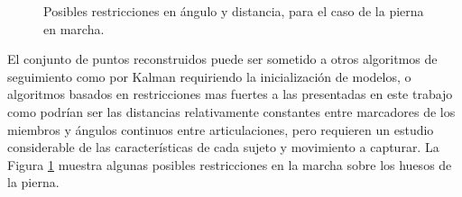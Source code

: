 \begin{figure}[ht!]
 \begin{center}
  \end{center}
\caption{Posibles restricciones en ángulo y distancia, para el caso de la pierna en marcha.}
\label{restricciones_tracking}
\end{figure}

El conjunto de puntos reconstruidos puede ser sometido a otros algoritmos de seguimiento como por Kalman \cite{kalman} requiriendo la inicialización de modelos, o algoritmos basados en restricciones mas fuertes a las presentadas en este trabajo como podrían ser las distancias relativamente constantes entre marcadores de los miembros y ángulos continuos entre articulaciones, pero requieren un estudio considerable de las características de cada sujeto y movimiento a capturar. La Figura \ref{restricciones_tracking} muestra algunas posibles restricciones en la marcha sobre los huesos de la pierna.

